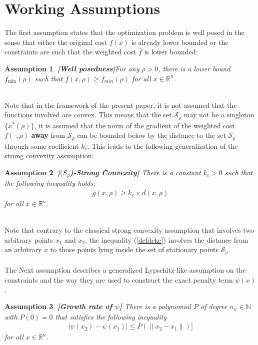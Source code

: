 \documentclass{article}
\newtheorem{assumption}{\bf Assumption}
\begin{document}
\section{Working Assumptions} \label{secworkingassumptions} 
\noindent The first assumption states that the optimization problem is well posed in the sense that either the original cost $f(x)$ is already lower bounded or the constraints are such that the weighted cost $\bar f$ is lower bounded:\\
\begin{assumption}{\bf [Well posedness]}\label{ass1} 
For any $\rho>0$, there is a lower bound $\bar f_{\min}(\rho)$ such that $\bar f(x,\rho)\ge \bar f_{min}(\rho)$ for all $x\in \mathbb{R}^{n}$.
\end{assumption}
\ \\
Note that in the framework of the present paper, it is not assumed that the functions involved are convex. This means that the set $\mathcal S_\rho$ may not be a singleton $\{x^*(\rho)\}$, it is assumed that the norm of the gradient of the weighted cost $\bar  f(\cdot,\rho)$ {\bf away} from $\mathcal S_\rho$ can be bounded below by the distance to the set $\mathcal S_\rho$ through some coefficient $k_c$. This leads to the following generalization of the strong convexity assumption:\\
\begin{assumption}{\bf [$\mathcal (S_\rho$)-Strong Convexity]} \label{ass2} 
There is a constant $k_c>0$ such that the following inequality holds:
\begin{eqnarray}
g(x,\rho)\ge k_c\times d(x,\rho) \label{defdekc} 
\end{eqnarray} 
for all $x\in \mathbb{R}^{n}$.
\end{assumption}
\ \\
Note that contrary to the classical strong convexity assumption that involves two arbitrary points $x_1$ and $x_2$, the inequality (\ref{defdekc}) involves the distance from an arbitrary $x$ to those points lying inside the set of stationary points $\mathcal S_\rho$.\ \\ \ \\ 
The Next assumption describes a generalized Lypschitz-like assumption on the constraints and the way they are used to construct the exact penalty term $\psi(x)$. \\
\begin{assumption}{\bf [Growth rate of $\psi$]} \label{ass3}  There is a polynomial $P$ of degree $n_\psi\in \mathbb{N}$ with $P(0)=0$  that satisfies the  following inequality
\begin{eqnarray}
\vert\psi(x_2)-\psi(x_1)\vert \le P(\|x_2-x_1\|)\bigr]\label{defdegrowthpsi} 
\end{eqnarray} 
for all $x\in \mathbb{R}^{n}$. 
\end{assumption}
\end{document}
